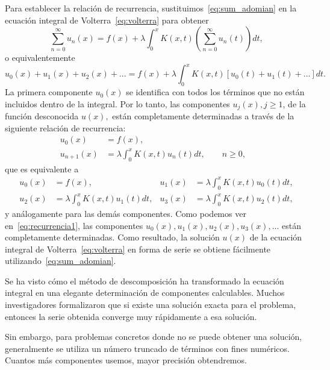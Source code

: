 Para establecer la relación de recurrencia, sustituimos~\eqref{eq:sum_adomian} en la ecuación integral de Volterra~\eqref{eq:volterra} para obtener 
\begin{equation}
	\sum_{n=0}^{\infty} u_n(x) = f(x) + \lambda \int_{0}^{x} K(x,t)(\sum_{n=0}^{\infty} u_n(t))dt,
\end{equation}
o equivalentemente
\begin{equation}
	u_0(x) + u_1(x) + u_2(x) + ... = f(x) + \lambda \int_{0}^{x} K(x,t)[u_0(t) + u_1(t) + ...]dt.
\end{equation}
La primera componente $u_0(x)$ se identifica con todos los términos que no están incluidos dentro de la integral. Por lo tanto, las componentes $u_j(x), j \geqslant 1$, de la función desconocida $u(x),$ están completamente determinadas a través de la siguiente relación de recurrencia:
\begin{align}
	u_0(x) &= f(x),      &   \\
	u_{n+1}(x) &= \lambda \int_{0}^{x} K(x,t)u_n(t)dt, \qquad n \geqslant 0,         & 
\end{align}
que es equivalente a 
\begin{align}\label{eq:recurrencia1}
	u_0(x)&=f(x),          &  u_1(x) &=\lambda \int_{0}^{x} K(x,t)u_0(t)dt,      \\
	u_2(x)&=\lambda \int_{0}^{x} K(x,t)u_1(t)dt,   &  u_3(x)&=\lambda \int_{0}^{x} K(x,t)u_2(t)dt, 
\end{align}
y análogamente para las demás componentes. Como podemos ver en~\eqref{eq:recurrencia1}, las componentes $u_0(x), u_1(x), u_2(x), u_3(x),...$ están completamente determinadas. Como resultado, la solución $u(x)$ de la ecuación integral de Volterra~\eqref{eq:volterra} en forma de serie se obtiene fácilmente utilizando~\eqref{eq:sum_adomian}.

\begin{observacion}
Se ha visto cómo el método de descomposición ha transformado la ecuación integral en una elegante determinación de componentes calculables. Muchos investigadores formalizaron que si existe una solución exacta para el problema, entonces la serie obtenida converge muy rápidamente a esa solución.

Sin embargo, para problemas concretos donde no se puede obtener una solución, generalmente se utiliza un número truncado de términos con fines numéricos. Cuantos más componentes usemos, mayor precisión obtendremos.
\end{observacion}


